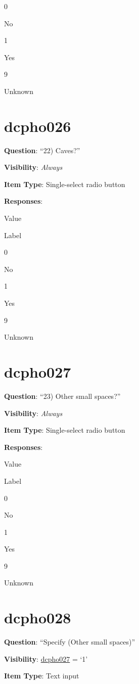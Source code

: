 \documentclass[]{book}
\begin{document}
0

No

1

Yes

9

Unknown

\hypertarget{dcpho026}{%
\section{dcpho026}\label{dcpho026}}

\textbf{Question}: ``22) Caves?''

\textbf{Visibility}: \emph{Always}

\textbf{Item Type}: Single-select radio button

\textbf{Responses}:

Value

Label

0

No

1

Yes

9

Unknown

\hypertarget{dcpho027}{%
\section{dcpho027}\label{dcpho027}}

\textbf{Question}: ``23) Other small spaces?''

\textbf{Visibility}: \emph{Always}

\textbf{Item Type}: Single-select radio button

\textbf{Responses}:

Value

Label

0

No

1

Yes

9

Unknown

\hypertarget{dcpho028}{%
\section{dcpho028}\label{dcpho028}}

\textbf{Question}: ``Specify (Other small spaces)''

\textbf{Visibility}: \protect\hyperlink{dcpho027}{dcpho027} = `1'

\textbf{Item Type}: Text input
\end{document}
